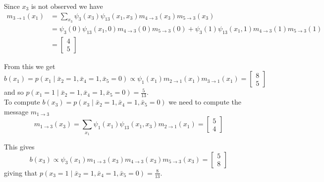 Since $x_3$ is not observed we have
$$
\begin{aligned}
m_{3 \rightarrow 1}\left(x_1\right)&=\sum_{x_3} \psi_3\left(x_3\right) \psi_{13}\left(x_1, x_3\right) m_{4 \rightarrow 3}\left(x_3\right) m_{5 \rightarrow 3}\left(x_3\right)\\
&=\psi_3\left(0\right) \psi_{13}\left(x_1, 0\right) m_{4 \rightarrow 3}\left(0\right) m_{5 \rightarrow 3}\left(0\right)+\psi_3\left(1\right) \psi_{13}\left(x_1, 1\right) m_{4 \rightarrow 3}\left(1\right) m_{5 \rightarrow 3}\left(1\right)\\
&=\left[\begin{array}{l}
4 \\
5
\end{array}\right]
\end{aligned}
$$

From this we get
$$
b\left(x_1\right)=p\left(x_1 \mid \bar{x}_2=1, \bar{x}_4=1, \bar{x}_5=0\right) \propto \psi_1\left(x_1\right) m_{2 \rightarrow 1}\left(x_1\right) m_{3 \rightarrow 1}\left(x_1\right)=\left[\begin{array}{l}
8 \\
5
\end{array}\right]
$$
and so $p\left(x_1=1 \mid \bar{x}_2=1, \bar{x}_4=1, \bar{x}_5=0\right)=\frac{5}{13}$.\\
To compute $b\left(x_3\right)=p\left(x_3 \mid \bar{x}_2=1, \bar{x}_4=1, \bar{x}_5=0\right)$ we need to compute the message $m_{1 \rightarrow 3}$
$$
m_{1 \rightarrow 3}\left(x_3\right)=\sum_{x_1} \psi_1\left(x_1\right) \psi_{13}\left(x_1, x_3\right) m_{2 \rightarrow 1}\left(x_1\right)=\left[\begin{array}{l}
5 \\
4
\end{array}\right]
$$

This gives
$$
b\left(x_3\right) \propto \psi_3\left(x_1\right) m_{1 \rightarrow 3}\left(x_3\right) m_{4 \rightarrow 3}\left(x_3\right) m_{5 \rightarrow 3}\left(x_3\right)=\left[\begin{array}{l}
5 \\
8
\end{array}\right]
$$
giving that $p\left(x_3=1 \mid \bar{x}_2=1, \bar{x}_4=1, \bar{x}_5=0\right)=\frac{8}{13}$.
